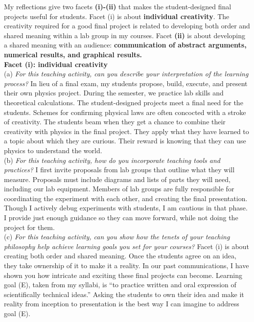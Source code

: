 \documentclass[../../../main.tex]{subfiles}
\begin{document}
My reflections give two facets \textbf{(i)-(ii)} that makes the student-designed final projects useful for students.  Facet (i) is about \textbf{individual creativity}.  The creativity required for a good final project is related to developing both order and shared meaning within a lab group in my courses.  Facet \textbf{(ii)} is about developing a shared meaning with an audience: \textbf{communication of abstract arguments, numerical results, and graphical results.}
\\
\vspace{0.15cm}
\textbf{Facet (i): individual creativity}
\\
\vspace{0.15cm}
(a) \textit{For this teaching activity, can you describe your interpretation of the learning process?} In lieu of a final exam, my students propose, build, execute, and present their own physics project.  During the semester, we practice lab skills and theoretical calculations.  The student-designed projects meet a final need for the students.  Schemes for confirming physical laws are often concocted with a stroke of creativity.  The students beam when they get a chance to combine their creativity with physics in the final project.  They apply what they have learned to a topic about which they are curious.  Their reward is knowing that they can use physics to understand the world. 
\\
\vspace{0.15cm}
(b) \textit{For this teaching activity, how do you incorporate teaching tools and practices?}  I first invite proposals from lab groups that outline what they will measure.  Proposals must include diagrams and lists of parts they will need, including our lab equipment.  Members of lab groups are fully responsible for coordinating the experiment with each other, and creating the final presentation.  Though I actively debug experiments with students, I am cautious in that phase. I provide just enough guidance so they can move forward, while not doing the project for them.
\\
\vspace{0.15cm}
(c) \textit{For this teaching activity, can you show how the tenets of your teaching philosophy help achieve learning goals you set for your courses?} Facet (i) is about creating both order and shared meaning.  Once the students agree on an idea, they take ownership of it to make it a reality.  In our past communications, I have shown you how intricate and exciting these final projects can become.  Learning goal (E), taken from my syllabi, is ``to practice written and oral expression of scientifically technical ideas.''  Asking the students to own their idea and make it reality from inception to presentation is the best way I can imagine to address goal (E).
\end{document}
